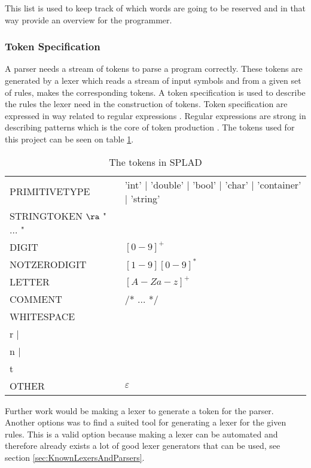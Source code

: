 
This list is used to keep track of which words are going to be reserved and in that way provide an overview for the programmer. 

\subsubsection{Token Specification}
A parser needs a stream of tokens to parse a program correctly. These tokens are generated by a lexer which reads a stream of input symbols and from a given set of rules, makes the corresponding tokens. A token specification is used to describe the rules the lexer need in the construction of tokens. Token specification are expressed in way related to regular expressions \citep{sebesta}. Regular expressions are strong in describing patterns which is the core of token production \citep{sipser}. The tokens used for this project can be seen on table \ref{tab:tokens}.

\begin{table}[H]
\begin{tabular}{l l}
PRIMITIVETYPE & 'int' | 'double' | 'bool' | 'char' | 'container' | 'string' \\
STRINGTOKEN $\ra$ " $\dots$  " \\
DIGIT & $[0 - 9]^+$ \\
NOTZERODIGIT & $[1-9][0-9]^*$ \\
LETTER & $[A-Za-z]^+$\\
COMMENT & /* $\dots$ */ \\
WHITESPACE & \\r | \\n | \\t \\
OTHER & $\varepsilon$ \\
\end{tabular}
\caption{The tokens in SPLAD}
\label{tab:tokens}
\end{table}

Further work would be making a lexer to generate a token for the parser. Another options was to find a suited tool for generating a lexer for the given rules. This is a valid option because making a lexer can be automated and therefore already exists a lot of good lexer generators that can be used, see section \ref{sec:KnownLexersAndParsers}.